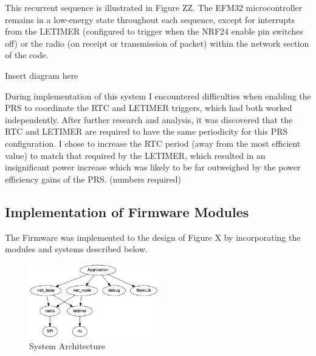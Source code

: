 This recurrent sequence is illustrated in Figure ZZ. The EFM32 microcontroller remains in a low-energy
state throughout each sequence, except for interrupts from the \ac{LETIMER} (configured to
trigger when the \ac{NRF24} enable pin switches off) or the radio (on receipt or transmission of packet)
within the network section of the code.


Insert diagram here


During implementation of this system I encountered difficulties when enabling the \ac{PRS} to coordinate
the \ac{RTC} and \ac{LETIMER} triggers, which had both worked independently. After further
research and analysis, it was discovered that the \ac{RTC} and \ac{LETIMER} are required to have the same
periodicity for this \ac{PRS} configuration. I chose to increase the \ac{RTC} period (away from the most
efficient value) to match that required by the \ac{LETIMER}, which resulted in an insignificant power
increase which was likely to be far outweighed by the power efficiency gains of the \ac{PRS}. (numbers
required)

\subsection{Implementation of Firmware Modules}
The Firmware was implemented to the design of Figure X by incorporating the modules and systems
described below.

\begin{figure}
  \vspace{-10pt}
  \begin{center}
    \includegraphics[width=0.5\textwidth, keepaspectratio=true]{images/modules_dep.png}
  \end{center}
  \caption[System Architecture]{System Architecture}
  \vspace{-10pt}
\end{figure}

